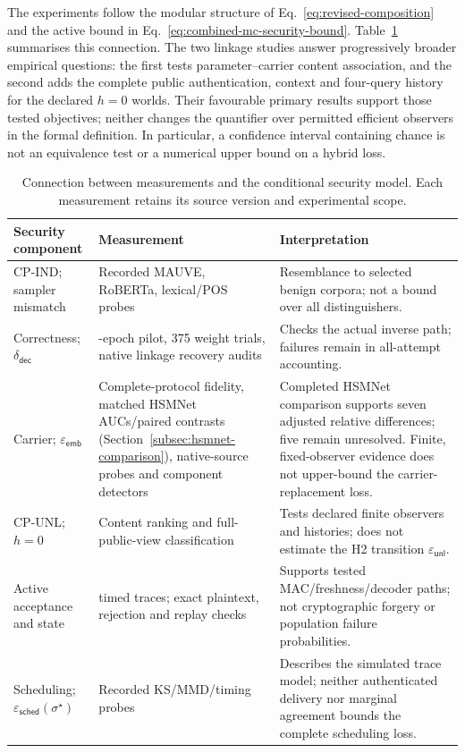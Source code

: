 \documentclass[pdflatex,sn-mathphys-num]{sn-jnl}%
\renewcommand{\arraystretch}{1.2}
\renewcommand{\arraystretch}{1.0}
\theoremstyle{definition}
\theoremstyle{game}
\theoremstyle{thmstyleone}%
\theoremstyle{thmstyletwo}%
\theoremstyle{thmstylethree}%
\begin{document}
The experiments follow the modular structure of
Eq.~\eqref{eq:revised-composition} and the active bound in
Eq.~\eqref{eq:combined-mc-security-bound}. Table~\ref{tab:empirical-security-map}
summarises this connection. The two linkage studies answer progressively
broader empirical questions: the first tests parameter--carrier content
association, and the second adds the complete public authentication,
context and four-query history for the declared $h=0$ worlds. Their
favourable primary results support those tested objectives; neither
changes the quantifier over permitted efficient observers in the formal
definition. In particular, a confidence interval containing chance is
not an equivalence test or a numerical upper bound on a hybrid loss.

\begin{table}[!t]
\centering\small
\caption{Connection between measurements and the conditional security
model. Each measurement retains its source version and experimental scope.}
\label{tab:empirical-security-map}
\setlength{\tabcolsep}{4pt}\renewcommand{\arraystretch}{1.12}
\begin{tabularx}{\textwidth}{@{}>{\raggedright\arraybackslash}p{}>{\raggedright\arraybackslash}p{}>{\raggedright\arraybackslash}X@{}}
\toprule
Security component & Measurement & Interpretation\\
\midrule
CP-IND; sampler mismatch & Recorded MAUVE, RoBERTa, lexical/POS probes & Resemblance to selected benign corpora; not a bound over all distinguishers.\\
\addlinespace
Correctness; $\delta_{\mathsf{dec}}$ & 300-epoch pilot, 375 weight trials, native linkage recovery audits & Checks the actual inverse path; failures remain in all-attempt accounting.\\
\addlinespace
Carrier; $\varepsilon_{\mathsf{emb}}$ & Complete-protocol fidelity, matched HSMNet AUCs/paired contrasts (Section~\ref{subsec:hsmnet-comparison}), native-source probes and component detectors & Completed HSMNet comparison supports seven adjusted relative differences; five remain unresolved. Finite, fixed-observer evidence does not upper-bound the carrier-replacement loss.\\
\addlinespace
CP-UNL; $h=0$ & Content ranking and full-public-view classification & Tests declared finite observers and histories; does not estimate the H2 transition $\varepsilon_{\mathsf{unl}}$.\\
\addlinespace
Active acceptance and state & 110 timed traces; exact plaintext, rejection and replay checks & Supports tested MAC/freshness/decoder paths; not cryptographic forgery or population failure probabilities.\\
\addlinespace
Scheduling; $\varepsilon_{\mathsf{sched}}(\sigma^\star)$ & Recorded KS/MMD/timing probes & Describes the simulated trace model; neither authenticated delivery nor marginal agreement bounds the complete scheduling loss.\\
\bottomrule
\end{tabularx}
\end{table}
\end{document}
